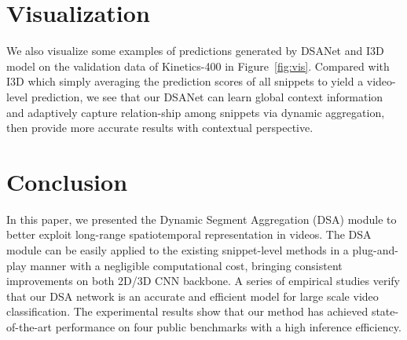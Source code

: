\documentclass[sigconf]{acmart}
\begin{document}
\section{Visualization}
We also visualize some examples of predictions generated by DSANet and I3D model on the validation data of Kinetics-400 in Figure~\ref{fig:vis}.
Compared with I3D which simply averaging the prediction scores of all snippets to yield a video-level prediction, we see that our DSANet can learn global context information and adaptively capture relation-ship among snippets via dynamic aggregation, then provide more accurate results with contextual perspective.




\section{Conclusion}
In this paper, we presented the Dynamic Segment Aggregation (DSA) module to better exploit long-range spatiotemporal representation in videos.
The DSA module can be easily applied to the existing snippet-level methods in a plug-and-play manner with a negligible computational cost, bringing consistent improvements on both 2D/3D CNN backbone.
A series of empirical studies verify that our DSA network is an accurate and efficient model for large scale video classification.
The experimental results show that our method has achieved state-of-the-art performance on four public benchmarks with a high inference efficiency.










\balance

\end{document}
